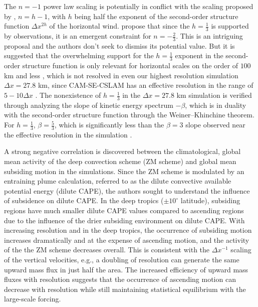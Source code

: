 \documentclass[times]{qjrms4}
\begin{document}
The $n=-1$ power law scaling is potentially in conflict with the scaling proposed by \cite{RETAL2016CD}, $n=h-1$, with $h$ being half the exponent of the second-order structure function $\Delta x^{2h}$ of the horizontal wind. \cite{RETAL2016CD} propose that since the $h=\frac{1}{3}$ is supported by observations, it is an emergent constraint for $n=-\frac{2}{3}$. This is an intriguing proposal and the authors don't seek to dismiss its potential value. But it is suggested that the overwhelming support for the $h=\frac{1}{3}$ exponent in the second-order structure function is only relevant for horizontal scales on the order of $100$ km and less \citep{L1999JFM,CL2001JGR}, which is not resolved in even our highest resolution simulation $\Delta x=27.8$ km, since CAM-SE-CSLAM has an effective resolution in the range of $5-10\Delta x$ \citep{HETAL2019JAMES}. The nonexistence of $h=\frac{1}{3}$ in the $\Delta x=27.8$ km simulation is verified through analyzing the slope of kinetic energy spectrum $-\beta$, which is in duality with the second-order structure function through the Weiner–Khinchine theorem. For $h=\frac{1}{3}$, $\beta=\frac{5}{3}$, which is significantly less than the $\beta=3$ slope observed near the effective resolution in the simulation {\color{red}{(Figure~X)}}.

A strong negative correlation is discovered between the climatological, global mean activity of the \cite{ZM1995AO} deep convection scheme (ZM scheme) and global mean subsiding motion in the simulations. Since the ZM scheme is modulated by an entraining plume calculation, referred to as the dilute convective available potential energy (dilute CAPE), the authors sought to understand the influence of subsidence on dilute CAPE. In the deep tropics ($\pm 10^{\circ}$ latitude), subsiding regions have much smaller dilute CAPE values compared to ascending regions due to the influence of the drier subsiding environment on dilute CAPE. With increasing resolution and in the deep tropics, the occurrence of subsiding motion increases dramatically and at the expense of ascending motion, and the activity of the the ZM scheme decreases overall. This is consistent with the $\Delta x^{-1}$ scaling of the vertical velocities, e.g., a doubling of resolution can generate the same upward mass flux in just half the area. The increased efficiency of upward mass fluxes with resolution suggests that the occurrence of ascending motion can decrease with resolution while still maintaining statistical equilibrium with the large-scale forcing.
\end{document}
